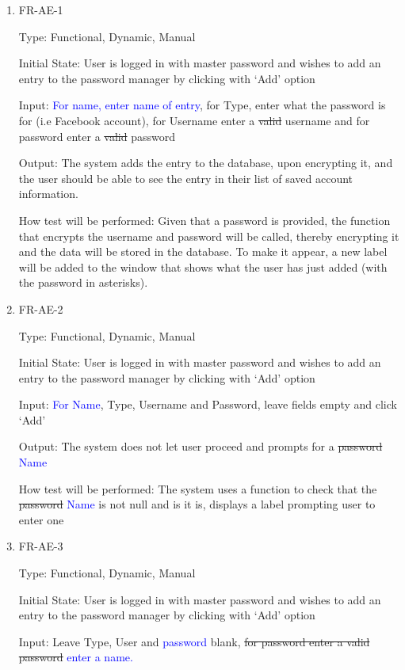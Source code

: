 \documentclass[12pt, titlepage]{article}
\begin{document}
\begin{enumerate}
\item{FR-AE-1\\}

Type: Functional, Dynamic, Manual

Initial State: User is logged in with master password and wishes to add an entry to the password manager by clicking with ‘Add’ option

Input: \textcolor{blue}{For name, enter name of entry}, for Type, enter what the password is for (i.e Facebook account), for Username enter a \sout{valid} username and for password enter a \sout{valid} password

Output: The system adds the entry to the database, upon encrypting it, and the user should be able to see the entry in their list of saved account information.

How test will be performed: Given that a password is provided, the function that encrypts the username and password will be called, thereby encrypting it and the data will be stored in the database. To make it appear, a new label will be added to the window that shows what the user has just added (with the password in asterisks).

\item{FR-AE-2\\}

Type: Functional, Dynamic, Manual

Initial State: User is logged in with master password and wishes to add an entry to the password manager by clicking with ‘Add’ option

Input: \textcolor{blue}{For Name}, Type, Username and Password, leave fields empty and click ‘Add’

Output: The system does not let user proceed and prompts for a \sout{password} \textcolor{blue}{Name}

How test will be performed: The system uses a function to check that the \sout{password} \textcolor{blue}{Name} is not null and is it is, displays a label prompting user to enter one

\item{FR-AE-3\\}

Type: Functional, Dynamic, Manual

Initial State: User is logged in with master password and wishes to add an entry to the password manager by clicking with ‘Add’ option

Input: Leave Type, User and \textcolor{blue}{password} blank, \sout{for password enter a valid password} \textcolor{blue}{enter a name.}


\end{enumerate}
\end{document}
